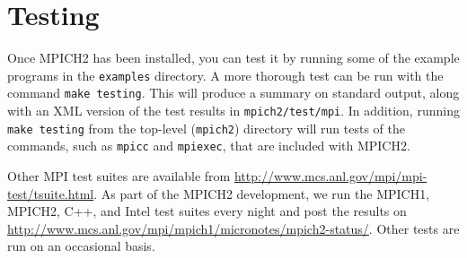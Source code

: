 \documentclass[dvipdfm,11pt]{article}
\begin{document}
\section{Testing}
\label{sec:testing}
Once MPICH2 has been installed, you can test it by running some of the example
programs in the \texttt{examples} directory.  A more thorough test can be run
with the command \texttt{make testing}.  This will produce a summary on
standard output, along with an XML version of the test results in 
\texttt{mpich2/test/mpi}. In addition, running \texttt{make testing} from the
top-level (\texttt{mpich2}) directory will run tests of the commands, such as
\texttt{mpicc} and \texttt{mpiexec}, that are included with MPICH2.

Other MPI test suites are available from
\url{http://www.mcs.anl.gov/mpi/mpi-test/tsuite.html}.  As part of the MPICH2
development, we run the MPICH1, MPICH2, C++, and Intel test suites every night
and post the results on
\url{http://www.mcs.anl.gov/mpi/mpich1/micronotes/mpich2-status/}.  Other
tests are run on an occasional basis.  









\end{document}
